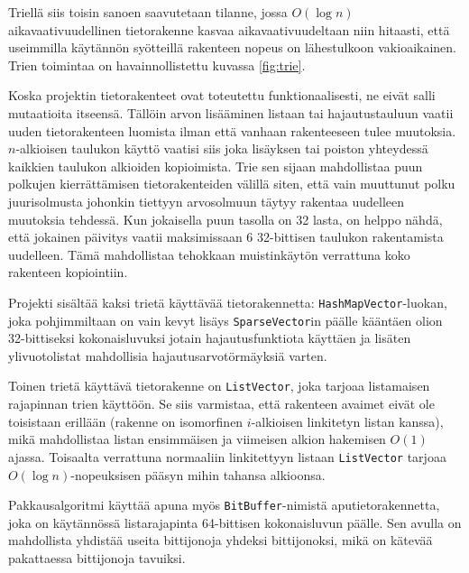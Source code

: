 \documentclass{article}
\newcommand{\code}{\texttt}
\begin{document}
\noindent Triellä siis toisin sanoen saavutetaan tilanne, jossa $O(\log n)$ aikavaativuudellinen tietorakenne kasvaa
aikavaativuudeltaan niin hitaasti, että useimmilla käytännön syötteillä rakenteen nopeus on lähestulkoon vakioaikainen. Trien toimintaa on havainnollistettu kuvassa \ref{fig:trie}.


Koska projektin tietorakenteet ovat toteutettu funktionaalisesti, ne eivät salli mutaatioita itseensä. Tällöin
arvon lisääminen listaan tai hajautustauluun vaatii uuden tietorakenteen luomista ilman että vanhaan rakenteeseen tulee muutoksia.
$n$-alkioisen taulukon käyttö vaatisi siis joka lisäyksen tai poiston yhteydessä kaikkien taulukon alkioiden kopioimista. Trie sen sijaan
mahdollistaa puun polkujen kierrättämisen tietorakenteiden välillä siten, että vain muuttunut polku juurisolmusta johonkin tiettyyn arvosolmuun
täytyy rakentaa uudelleen muutoksia tehdessä. Kun jokaisella puun tasolla on 32 lasta, on helppo nähdä, että jokainen päivitys
vaatii maksimissaan 6 32-bittisen taulukon rakentamista uudelleen. Tämä mahdollistaa tehokkaan muistinkäytön verrattuna koko rakenteen kopiointiin.


Projekti sisältää kaksi trietä käyttävää tietorakennetta: \code{HashMapVector}-luokan, joka pohjimmiltaan on vain kevyt
lisäys \code{SparseVector}in päälle kääntäen olion 32-bittiseksi kokonaisluvuksi jotain hajautusfunktiota käyttäen ja lisäten
ylivuotolistat mahdollisia hajautusarvotörmäyksiä varten.

Toinen trietä käyttävä tietorakenne on \code{ListVector}, joka tarjoaa listamaisen rajapinnan trien käyttöön.
Se siis varmistaa, että rakenteen avaimet eivät ole toisistaan erillään (rakenne on isomorfinen $i$-alkioisen linkitetyn listan kanssa),
mikä mahdollistaa listan ensimmäisen ja viimeisen alkion hakemisen $O(1)$ ajassa.
Toisaalta verrattuna normaaliin linkitettyyn listaan \code{ListVector} tarjoaa $O(\log n)$-nopeuksisen pääsyn mihin tahansa
alkioonsa.

Pakkausalgoritmi käyttää apuna myös \code{BitBuffer}-nimistä aputietorakennetta, joka on käytännössä listarajapinta
64-bittisen kokonaisluvun päälle. Sen avulla on mahdollista yhdistää useita bittijonoja yhdeksi bittijonoksi, mikä on kätevää
pakattaessa bittijonoja tavuiksi.
\end{document}
